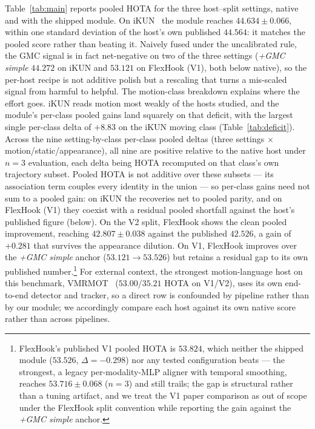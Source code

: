 \documentclass[sigconf,review,anonymous]{acmart}
\begin{document}
Table~\ref{tab:main} reports pooled HOTA for the three host--split settings, native and with the shipped module. On iKUN~\cite{ikun} the module reaches $44.634 \pm 0.066$, within one standard deviation of the host's own published $44.564$: it matches the pooled score rather than beating it. Naively fused under the uncalibrated rule, the GMC signal is in fact net-negative on two of the three settings (\emph{+GMC simple} $44.272$ on iKUN and $53.121$ on FlexHook (V1), both below native), so the per-host recipe is not additive polish but a rescaling that turns a mis-scaled signal from harmful to helpful. The motion-class breakdown explains where the effort goes. iKUN reads motion most weakly of the hosts studied, and the module's per-class pooled gains land squarely on that deficit, with the largest single per-class delta of $+8.83$ on the iKUN moving class (Table~\ref{tab:deficit}). Across the nine setting-by-class per-class pooled deltas (three settings $\times$ motion/static/appearance), all nine are positive relative to the native host under $n{=}3$ evaluation, each delta being HOTA recomputed on that class's own trajectory subset. Pooled HOTA is not additive over these subsets --- its association term couples every identity in the union --- so per-class gains need not sum to a pooled gain: on iKUN the recoveries net to pooled parity, and on FlexHook (V1) they coexist with a residual pooled shortfall against the host's published figure (below). On the V2 split, FlexHook shows the clean pooled improvement, reaching $42.807 \pm 0.038$ against the published $42.526$, a gain of $+0.281$ that survives the appearance dilution. On V1, FlexHook improves over the \emph{+GMC simple} anchor ($53.121 \to 53.526$) but retains a residual gap to its own published number.\footnote{FlexHook's published V1 pooled HOTA is $53.824$, which neither the shipped module ($53.526$, $\Delta=-0.298$) nor any tested configuration beats --- the strongest, a legacy per-modality-MLP aligner with temporal smoothing, reaches $53.716 \pm 0.068$ ($n{=}3$) and still trails; the gap is structural rather than a tuning artifact, and we treat the V1 paper comparison as out of scope under the FlexHook split convention while reporting the gain against the \emph{+GMC simple} anchor.} For external context, the strongest motion-language host on this benchmark, VMRMOT~\cite{vmrmot} ($53.00$/$35.21$ HOTA on V1/V2), uses its own end-to-end detector and tracker, so a direct row is confounded by pipeline rather than by our module; we accordingly compare each host against its own native score rather than across pipelines.
\end{document}
